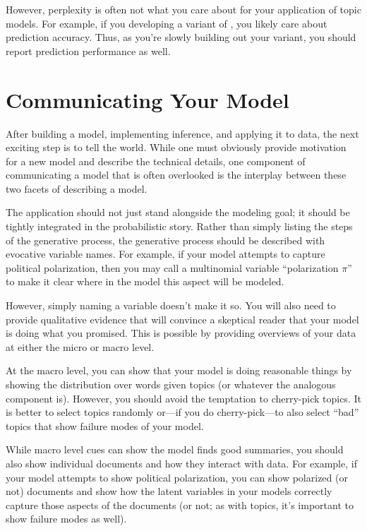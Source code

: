 However, perplexity is often not what you care about for your
application of topic models.  For example, if you developing a variant
of , you likely care about prediction accuracy.  Thus, as
you're slowly building out your  variant, you should report
prediction performance as well.

\section{Communicating Your Model}

After building a model, implementing inference, and applying it to
data, the next exciting step is to tell the world.  While one must
obviously provide motivation for a new model and describe the
technical details, one component of communicating a model that is
often overlooked is the interplay between these two facets of
describing a model.

The application should not just stand alongside the modeling goal; it
should be tightly integrated in the probabilistic story.  Rather than
simply listing the steps of the generative process, the generative
process should be described with evocative variable names.  For
example, if your model attempts to capture political polarization,
then you may call a multinomial variable ``polarization $\pi$'' to
make it clear where in the model this aspect will be modeled.

However, simply naming a variable doesn't make it so.  You will also
need to provide qualitative evidence that will convince a skeptical
reader that your model is doing what you promised.  This is possible
by providing overviews of your data at either the micro or macro
level.

At the macro level, you can show that your model is doing reasonable
things by showing the distribution over words given topics (or
whatever the analogous component is).  However, you should avoid the
temptation to cherry-pick topics.  It is better to select topics
randomly or---if you do cherry-pick---to also select ``bad'' topics
that show failure modes of your model.

While macro level cues can show the model finds good summaries, you
should also show individual documents and how they interact with
data.  For example, if your model attempts to show political
polarization, you can show polarized (or not) documents and show how
the latent variables in your models correctly capture those aspects of
the documents (or not; as with topics, it's important to show failure
modes as well).

